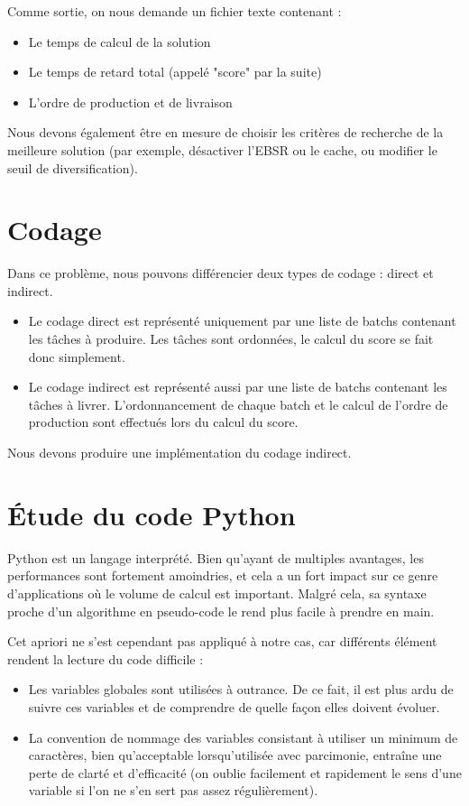 \documentclass[hideweeklyreports]{polytech/polytech}
\begin{document}
			Comme sortie, on nous demande un fichier texte contenant :
			\begin{itemize}
				\item Le temps de calcul de la solution
				\item Le temps de retard total (appelé "score" par la suite)
				\item L'ordre de production et de livraison
			\end{itemize}
			
			Nous devons également être en mesure de choisir les critères de recherche de la meilleure solution (par exemple, désactiver l'EBSR ou le cache, ou modifier le seuil de diversification).
			
		\section{Codage}
			Dans ce problème, nous pouvons différencier deux types de codage : direct et indirect.
			\begin{itemize}
				\item Le codage direct est représenté uniquement par une liste de batchs contenant les tâches à produire. Les tâches sont ordonnées, le calcul du score se fait donc simplement.
				\item Le codage indirect est représenté aussi par une liste de batchs contenant les tâches à livrer. L'ordonnancement de chaque batch et le calcul de l'ordre de production sont effectués lors du calcul du score.
			\end{itemize}
			
			Nous devons produire une implémentation du codage indirect.
			
		
		\section{Étude du code Python}
			Python est un langage interprété. Bien qu'ayant de multiples avantages, les performances sont fortement amoindries, et cela a un fort impact sur ce genre d'applications où le volume de calcul est important. Malgré cela, sa syntaxe proche d'un algorithme en pseudo-code le rend plus facile à prendre en main.
			
			Cet apriori ne s'est cependant pas appliqué à notre cas, car différents élément rendent la lecture du code difficile :
			\begin{itemize}
				\item Les variables globales sont utilisées à outrance. De ce fait, il est plus ardu de suivre ces variables et de comprendre de quelle façon elles doivent évoluer.
				\item La convention de nommage des variables consistant à utiliser un minimum de caractères, bien qu'acceptable lorsqu'utilisée avec parcimonie, entraîne une perte de clarté et d'efficacité (on oublie facilement et rapidement le sens d'une variable si l'on ne s'en sert pas assez régulièrement).
			\end{itemize}
			
\end{document}
